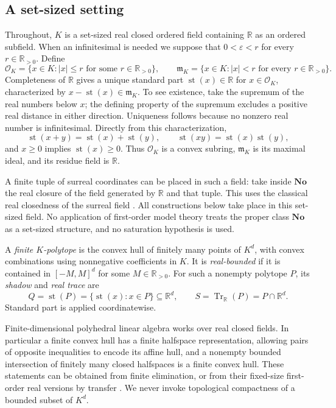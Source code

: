 \documentclass[11pt,a4paper]{article}
\numberwithin{equation}{section}
\theoremstyle{plain}
\newcommand{\No}{\mathbf{No}}
\newcommand{\R}{\mathbb R}
\newcommand{\eps}{\varepsilon}
\newcommand{\st}{\operatorname{st}}
\newcommand{\Tr}{\operatorname{Tr}_{\R}}%
\newcommand{\tr}{\operatorname{tr}}%
\begin{document}
\subsection{A set-sized setting}

Throughout, $K$ is a set-sized real closed ordered field containing $\R$ as
an ordered subfield. When an infinitesimal is needed we suppose that
$0<\eps<r$ for every $r\in\R_{>0}$. Define
\[
 \mathcal O_K=\{x\in K:|x|\leq r\text{ for some }r\in\R_{>0}\},
 \qquad
 \mathfrak m_K=\{x\in K:|x|<r\text{ for every }r\in\R_{>0}\}.
\]
Completeness of $\R$ gives a unique standard part
$\st(x)\in\R$ for $x\in\mathcal O_K$, characterized by
$x-\st(x)\in\mathfrak m_K$. To see existence, take the supremum of the real
numbers below $x$; the defining property of the supremum excludes a positive
real distance in either direction. Uniqueness follows because no nonzero
real number is infinitesimal. Directly from this characterization,
\[
 \st(x+y)=\st(x)+\st(y),\qquad
 \st(xy)=\st(x)\st(y),
\]
and $x\geq0$ implies $\st(x)\geq0$. Thus $\mathcal O_K$ is a convex subring,
$\mathfrak m_K$ is its maximal ideal, and its residue field is $\R$.

A finite tuple of surreal coordinates can be placed in such a field: take
inside $\No$ the real closure of the field generated by $\R$ and that tuple.
This uses the classical real closedness of the surreal field
\cite{ehr:gonshor}. All constructions below take place in this set-sized field.
No application of first-order model theory treats the proper class $\No$
as a set-sized structure, and no saturation hypothesis is used.

\begin{definition}
A \emph{finite $K$-polytope} is the convex hull of finitely many points of
$K^d$, with convex combinations using nonnegative coefficients in $K$.
It is \emph{real-bounded} if it is contained in $[-M,M]^d$ for some
$M\in\R_{>0}$. For such a nonempty polytope $P$, its \emph{shadow} and
\emph{real trace} are
\[
 Q=\st(P)=\{\st(x):x\in P\}\subseteq\R^d,
 \qquad S=\Tr(P)=P\cap\R^d.
\]
Standard part is applied coordinatewise.
\end{definition}

Finite-dimensional polyhedral linear algebra works over real closed fields.
In particular a finite convex hull has a finite halfspace representation,
allowing pairs of opposite inequalities to encode its affine hull, and a
nonempty bounded intersection of finitely many closed halfspaces is a finite
convex hull. These statements can be obtained from finite elimination, or
from their fixed-size first-order real versions by transfer
\cite{ehr:bpr}. We never invoke topological compactness of a bounded subset of
$K^d$.
\end{document}
